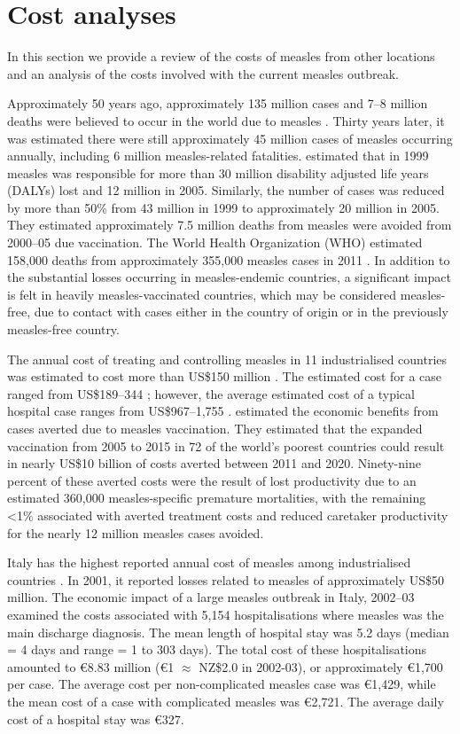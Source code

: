 \documentclass{article}
\begin{document}
\section{Cost analyses}

In this section we provide a review of the costs of measles from other locations and an analysis of the costs involved with the current measles outbreak.

Approximately 50 years ago, approximately 135 million cases and 7--8 million deaths were believed to occur in the world due to measles \citep{clements4}. Thirty years later, it was estimated there were still approximately 45 million cases of measles occurring annually, including 6 million measles-related fatalities. \citep{wolfson7} estimated that in 1999 measles was responsible for more than 30 million disability adjusted life years (DALYs) lost and 12 million in 2005. Similarly, the number of cases was reduced by more than 50\% from 43 million in 1999 to approximately 20 million in 2005. They estimated approximately 7.5 million deaths from measles were avoided from 2000--05 due vaccination. The World Health Organization (WHO) estimated 158,000 deaths from approximately 355,000 measles cases in 2011 \citep{who13}.  In addition to the substantial losses occurring in measles-endemic countries, a significant impact is felt in heavily measles-vaccinated countries, which may be considered measles-free, due to contact with cases either in the country of origin or in the previously measles-free country.

The annual cost of treating and controlling measles in 11 industrialised countries was estimated to cost more than US\$150 million \citep{carabin3}. The estimated cost for a case ranged from US\$189--344 \citep{carabin3}; however, the average estimated cost of a typical hospital case ranges from US\$967--1,755 \citep{carabin2}. \citep{stack11} estimated the economic benefits from cases averted due to measles vaccination. They estimated that the expanded vaccination from 2005 to 2015 in 72 of the world's poorest countries could result in nearly US\$10 billion of costs averted between 2011 and 2020. Ninety-nine percent of these averted costs were the result of lost productivity due to an estimated 360,000 measles-specific premature mortalities, with the remaining <1\% associated with averted treatment costs and reduced caretaker productivity for the nearly 12 million measles cases avoided.


Italy has the highest reported annual cost of measles among industrialised countries \citep{carabin3}. In 2001, it reported losses related to measles of approximately US\$50 million. The economic impact of a large measles outbreak in Italy, 2002--03 examined the costs associated with 5,154 hospitalisations where measles was the main discharge diagnosis. The mean length of hospital stay was 5.2 days (median = 4 days and range = 1 to 303 days). The total cost of these hospitalisations amounted to \euro 8.83 million (\euro 1 $\approx$ NZ\$2.0 in 2002-03), or approximately \euro 1,700 per case. The average cost per non-complicated measles case was  \euro 1,429, while the mean cost of a case with complicated measles was  \euro 2,721. The average daily cost of a hospital stay was  \euro 327.
\end{document}
